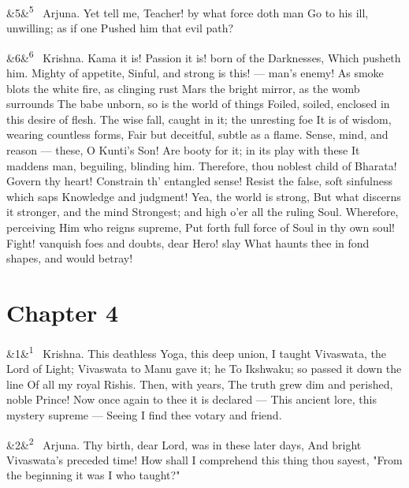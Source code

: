 \documentclass[12pt]{article}
\newcommand{\para}[1][]{\par\noindent\ifx&#1&\else\textsuperscript{\footnotesize #1}~\fi}
\begin{document}
\para[5] Arjuna. Yet tell me, Teacher! by what force doth man Go to his ill, unwilling; as if one Pushed him that evil path?

\para[6] Krishna. Kama it is! Passion it is! born of the Darknesses, Which pusheth him. Mighty of appetite, Sinful, and strong is this! --- man's enemy! As smoke blots the white fire, as clinging rust Mars the bright mirror, as the womb surrounds The babe unborn, so is the world of things Foiled, soiled, enclosed in this desire of flesh. The wise fall, caught in it; the unresting foe It is of wisdom, wearing countless forms, Fair but deceitful, subtle as a flame. Sense, mind, and reason --- these, O Kunti's Son! Are booty for it; in its play with these It maddens man, beguiling, blinding him. Therefore, thou noblest child of Bharata! Govern thy heart! Constrain th' entangled sense! Resist the false, soft sinfulness which saps Knowledge and judgment! Yea, the world is strong, But what discerns it stronger, and the mind Strongest; and high o'er all the ruling Soul. Wherefore, perceiving Him who reigns supreme, Put forth full force of Soul in thy own soul! Fight! vanquish foes and doubts, dear Hero! slay What haunts thee in fond shapes, and would betray!

\section*{Chapter 4}

\para[1] Krishna. This deathless Yoga, this deep union, I taught Vivaswata, the Lord of Light; Vivaswata to Manu gave it; he To Ikshwaku; so passed it down the line Of all my royal Rishis. Then, with years, The truth grew dim and perished, noble Prince! Now once again to thee it is declared --- This ancient lore, this mystery supreme --- Seeing I find thee votary and friend.

\para[2] Arjuna. Thy birth, dear Lord, was in these later days, And bright Vivaswata's preceded time! How shall I comprehend this thing thou sayest, "From the beginning it was I who taught?"
\end{document}
